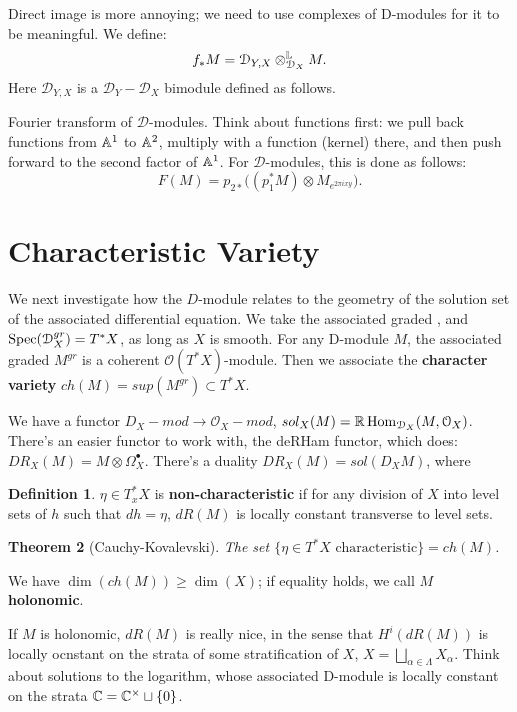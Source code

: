 \documentclass[10pt,a4paper,reqno,oneside]{book} %
\theoremstyle{plain}
\newtheorem{thm}{Theorem}[section]
\theoremstyle{definition}
\newtheorem{defin}[thm]{Definition}
\theoremstyle{remark}
\numberwithin{equation}{section}
\begin{document}
Direct image is more annoying; we need to use complexes of D-modules for it to be meaningful. We define:
\[	f_* M = \mathcal{D}_{Y , X} \otimes^{\mathbb L}_{\mathcal{D}_X} M.	\]
Here $\mathcal{D}_{Y , X}$ is a $\mathcal{D}_Y - \mathcal{D}_X$ bimodule defined as follows. 


Fourier transform of $\mathcal{D}$-modules. Think about functions first: we pull back functions from $\mathbb A^1$ to
$\mathbb A^2$, multiply with a function (kernel) there, and then push forward to the second factor of $\mathbb A^1$.
For $\mathcal{D}$-modules, this is done as follows:
\[	F(M) = p_{2*} \big( (p_1^* M) \otimes M_{e^{2\pi i xy}} \big) . \]


\section{Characteristic Variety}
We next investigate how the $D$-module relates to the geometry of the solution set of the associated differential equation.
We take the associated graded , and $\operatorname{Spec} (\mathcal{D}_X^{gr}) = T^*X$, as long as $X$ is
smooth. For any D-module $M$, the associated graded $M^{gr}$ is a coherent $\mathcal{O}(T^*X)$-module. Then we associate
the \textbf{character variety} $ch(M) =  sup(M^{gr}) \subset T^*X$.

We have a functor $D_X -mod \to \mathcal{O}_X -mod$, $sol_X (M) = \mathbb R \operatorname{Hom}_{\mathcal{D}_X}(M,\mathcal{O}_X)$.
There's an easier functor to work with, the deRHam functor, which does: $DR_X(M) = M \otimes \Omega_X^{\bullet}$.
There's a duality $DR_X(M) = sol(D_X M)$, where 

\begin{defin}
$\eta \in T^*_x X$ is \textbf{non-characteristic} if for any division of $X$ into level sets of $h$ such that $dh = \eta$,
$dR(M)$ is locally constant transverse to level sets.
\end{defin}

\begin{thm}[Cauchy-Kovalevski]
The set $\{\eta \in T^*X \text{ characteristic}\} = ch(M)$.
\end{thm}

We have $\dim(ch(M)) \geq \dim(X)$; if equality holds, we call $M$ \textbf{holonomic}.

If $M$ is holonomic, $dR(M)$ is really nice, in the sense that $H^i(dR(M))$ is locally ocnstant on the strata of some 
stratification of $X$, $X = \bigsqcup_{\alpha \in \Lambda} X_{\alpha}$. Think about solutions to the logarithm,
whose associated D-module is locally constant on the strata $\mathbb C = \mathbb C^{\times} \sqcup \{0\}$.
\end{document}
